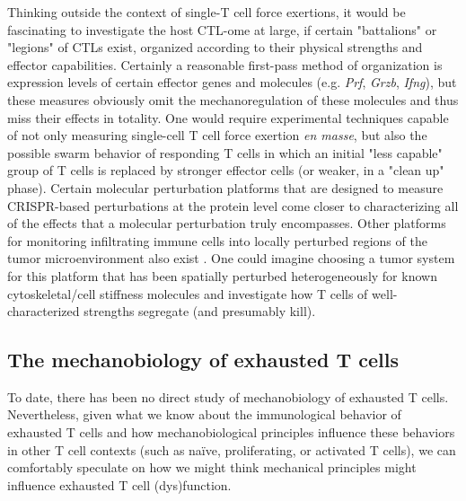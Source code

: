 Thinking outside the context of single-T cell force exertions, it would be fascinating to investigate the host CTL-ome at large, if certain "battalions" or "legions" of CTLs exist, organized according to their physical strengths and effector capabilities. Certainly a reasonable first-pass method of organization is expression levels of certain effector genes and molecules (e.g. \textit{Prf}, \textit{Grzb}, \textit{Ifng}), but these measures obviously omit the  mechanoregulation of these molecules and thus miss their effects in totality. One would require experimental techniques capable of not only measuring single-cell T cell force exertion \textit{en masse}, but also the possible swarm behavior of responding T cells in which an initial "less capable" group of T cells is replaced by stronger effector cells (or weaker, in a "clean up" phase). Certain molecular perturbation platforms that are designed to measure CRISPR-based perturbations at the protein level \cite{Wroblewska2018} come closer to characterizing all of the effects that a molecular perturbation truly encompasses. Other platforms for monitoring infiltrating immune cells into locally perturbed regions of the tumor microenvironment also exist \cite{MaximeDhainaut2021}. One could imagine choosing a tumor system for this platform that has been spatially perturbed heterogeneously for known cytoskeletal/cell stiffness molecules and investigate how T cells of well-characterized strengths segregate (and presumably kill).

\subsection{The mechanobiology of exhausted T cells}

To date, there has been no direct study of mechanobiology of exhausted T cells. Nevertheless, given what we know about the immunological behavior of exhausted T cells and how mechanobiological principles influence these behaviors in other T cell contexts (such as na{\"i}ve, proliferating, or activated T cells), we can comfortably speculate on how we might think mechanical principles might influence exhausted T cell (dys)function.

